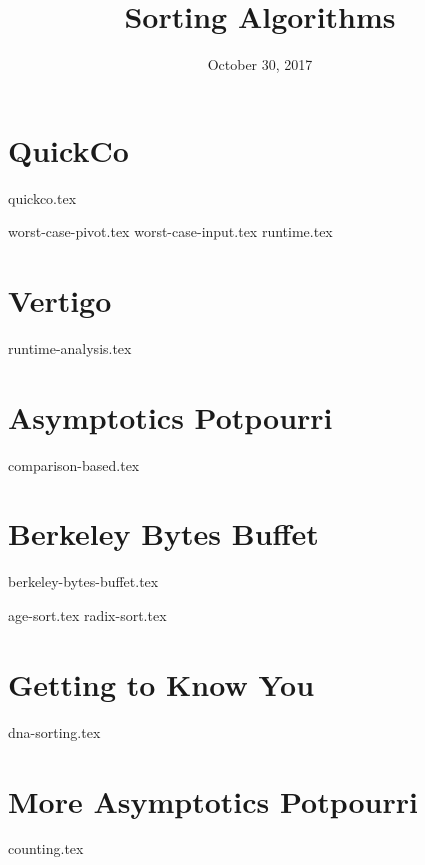 \documentclass[11pt]{exam}
\title{Sorting Algorithms}
\date{October 30, 2017}
\begin{document}
\maketitle

\section{QuickCo}
{quickco.tex}
\begin{questions}
{worst-case-pivot.tex}
{worst-case-input.tex}
{runtime.tex}
\end{questions}

\section{Vertigo}
\begin{questions}
{runtime-analysis.tex}
\end{questions}

\section{Asymptotics Potpourri}
{comparison-based.tex}

\clearpage

\section{Berkeley Bytes Buffet}
{berkeley-bytes-buffet.tex}
\begin{questions}
{age-sort.tex}
{radix-sort.tex}
\end{questions}

\section{Getting to Know You}
\begin{questions}
{dna-sorting.tex}
\end{questions}

\section{More Asymptotics Potpourri}
{counting.tex}
\end{document}

